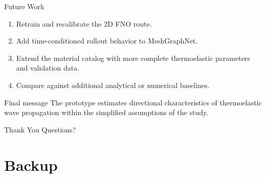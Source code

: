 \documentclass[aspectratio=169,10pt]{beamer}
\begin{document}
\begin{frame}{Future Work}
  \begin{enumerate}
    \item Retrain and recalibrate the 2D FNO route.
    \item Add time-conditioned rollout behavior to MeshGraphNet.
    \item Extend the material catalog with more complete thermoelastic
          parameters and validation data.
    \item Compare against additional analytical or numerical baselines.
  \end{enumerate}
  \vskip 8pt
  \begin{exampleblock}{Final message}
    The prototype estimates directional characteristics of thermoelastic
    wave propagation within the simplified assumptions of the study.
  \end{exampleblock}
\end{frame}

\begin{frame}{Thank You}
  \centering
  \Large Questions?
\end{frame}

\section{Backup}
\end{document}
